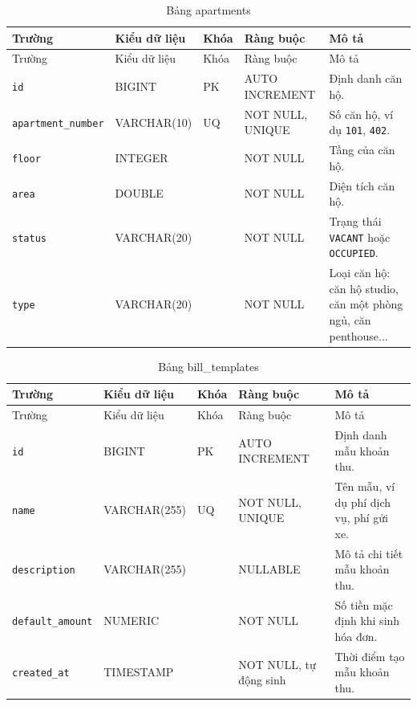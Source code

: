 ﻿\documentclass[12pt,a4paper]{report}
\begin{document}
\begin{longtable}{L{4.2cm} L{2.15cm} L{0.75cm} L{3.05cm} L{4.0cm}}
\caption{Bảng apartments}\label{tab:db-apartments}\\
\toprule
Trường & Kiểu dữ liệu & Khóa & Ràng buộc & Mô tả \\
\midrule
\endfirsthead
\toprule Trường & Kiểu dữ liệu & Khóa & Ràng buộc & Mô tả \\\midrule
\endhead
\texttt{id} & BIGINT & PK & AUTO INCREMENT & Định danh căn hộ. \\
\texttt{apartment\_number} & VARCHAR(10) & UQ & NOT NULL, UNIQUE & Số căn hộ, ví dụ \texttt{101}, \texttt{402}. \\
\texttt{floor} & INTEGER & & NOT NULL & Tầng của căn hộ. \\
\texttt{area} & DOUBLE & & NOT NULL & Diện tích căn hộ. \\
\texttt{status} & VARCHAR(20) & & NOT NULL & Trạng thái \texttt{VACANT} hoặc \texttt{OCCUPIED}. \\
\texttt{type} & VARCHAR(20) & & NOT NULL & Loại căn hộ: căn hộ studio, căn một phòng ngủ, căn penthouse... \\
\bottomrule
\end{longtable}

\begin{longtable}{L{4.2cm} L{2.15cm} L{0.75cm} L{3.05cm} L{4.0cm}}
\caption{Bảng bill\_templates}\label{tab:db-bill-templates}\\
\toprule
Trường & Kiểu dữ liệu & Khóa & Ràng buộc & Mô tả \\
\midrule
\endfirsthead
\toprule Trường & Kiểu dữ liệu & Khóa & Ràng buộc & Mô tả \\\midrule
\endhead
\texttt{id} & BIGINT & PK & AUTO INCREMENT & Định danh mẫu khoản thu. \\
\texttt{name} & VARCHAR(255) & UQ & NOT NULL, UNIQUE & Tên mẫu, ví dụ phí dịch vụ, phí gửi xe. \\
\texttt{description} & VARCHAR(255) & & NULLABLE & Mô tả chi tiết mẫu khoản thu. \\
\texttt{default\_amount} & NUMERIC & & NOT NULL & Số tiền mặc định khi sinh hóa đơn. \\
\texttt{created\_at} & TIMESTAMP & & NOT NULL, tự động sinh & Thời điểm tạo mẫu khoản thu. \\
\bottomrule
\end{longtable}
\end{document}
